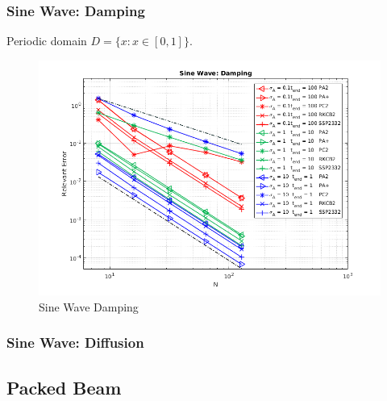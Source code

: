 \subsubsection{Sine Wave: Damping}

Periodic domain $D=\{x:x\in[0,1]\}$.  

\begin{figure}[h]
  \centering
    \includegraphics[width=1\textwidth]{figures/SineWaveDamping}
   \caption{Sine Wave Damping}
  \label{fig:SineWaveDamping}
\end{figure}

\subsubsection{Sine Wave: Diffusion}

\subsection{Packed Beam}

